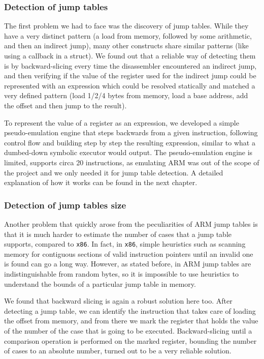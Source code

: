 \documentclass[a4paper,11pt,oneside]{report}
\begin{document}
\subsubsection{Detection of jump tables}
The first problem we had to face was the discovery of jump tables. While they 
have a very distinct pattern (a load from memory, followed by some arithmetic, 
and then an indirect jump), many other constructs share similar patterns (like 
using a callback in a struct). We found out that a reliable way of detecting 
them is by backward-slicing every time the disassembler encountered an indirect 
jump, and then verifying if the value of the register used for the indirect 
jump could be represented with an expression which could be resolved statically 
and matched a very defined pattern (load 1/2/4 bytes from memory, load a base 
address, add the offset and then jump to the result). 

To represent the value of a register as an expression, we developed a simple
pseudo-emulation engine that steps backwards from a given instruction, 
following control flow and building step by step the resulting expression, 
similar to what a dumbed-down symbolic executor would output. The 
pseudo-emulation engine is limited, supports circa 20 instructions, as 
emulating ARM was out of the scope of the project and we only needed it for 
jump table detection. A detailed explanation of how it works can be found in 
the next chapter.

\subsubsection{Detection of jump tables size}
Another problem that quickly arose from the peculiarities of ARM jump tables is 
that it is much harder to estimate the number of cases that a jump table 
supports, compared to \texttt{x86}. In fact, in \texttt{x86}, simple heuristics 
such as scanning memory for contiguous sections of valid instruction pointers 
until an invalid one is found can go a long way. However, as stated before, in 
ARM jump tables are indistinguishable from random bytes, so it is impossible to 
use heuristics to understand the bounds of a particular jump table in memory.

We found that backward slicing is again a robust solution here too. After 
detecting a jump table, we can identify the instruction that takes care of 
loading the offset from memory, and from there we mark the register that holds 
the value of the number of the case that is going to be executed.  
Backward-slicing until a comparison operation is performed on the marked 
register, bounding the number of cases to an absolute number, turned out to be 
a very reliable solution.  
\end{document}
